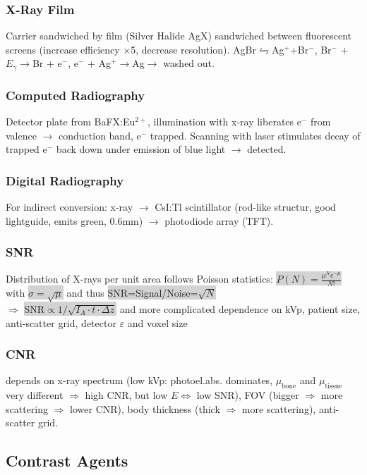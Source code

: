 \documentclass[9pt]{article}
\newcommand{\grey}[1]{\setlength{\fboxsep}{0pt}\colorbox{lightgrey}{#1}}
\begin{document}
\begin{multicols}{2}
\subsubsection{X-Ray Film}
Carrier sandwiched by film (Silver Halide AgX) sandwiched between fluorescent screens (increase efficiency $\times$5, decrease resolution). AgBr$\leftrightharpoons$Ag${}^+$+Br${}^-$, Br${}^-$ + $E_\gamma\rightarrow$Br + e${}^-$, e${}^-$ + Ag${}^+ \rightarrow$Ag$\rightarrow$ washed out.

\subsubsection{Computed Radiography}
Detector plate from BaFX:Eu${}^{2+}$, illumination with x-ray liberates e${}^-$ from valence $\rightarrow$ conduction band, e${}^-$ trapped. Scanning with laser stimulates decay of trapped e${}^-$ back down under emission of blue light $\rightarrow$ detected.

\subsubsection{Digital Radiography} For indirect conversion: x-ray $\rightarrow$ CsI:Tl scintillator (rod-like structur, good lightguide, emits green, 0.6mm) $\rightarrow$ photodiode array (TFT).

\subsubsection{SNR}
Distribution of X-rays per unit area follows Poisson statistics: \grey{$P(N)=\frac{\mu^Ne^{-\mu}}{N!}$} with \grey{$\sigma = \sqrt{\mu}$} and thus \grey{SNR=Signal/Noise=$\sqrt{N}$}\\
$\Rightarrow$ \grey{SNR$\propto 1 / \sqrt{I_A\cdot t \cdot \Delta z}$} and more complicated dependence on kVp, patient size, anti-scatter grid, detector $\varepsilon$ and voxel size

\subsubsection{CNR} depends on x-ray spectrum (low kVp: photoel.abs. dominates, $\mu_\mathrm{bone}$ and $\mu_\mathrm{tissue}$ very different $\Rightarrow$ high CNR, but low $E \Leftrightarrow$ low SNR), FOV (bigger $\Rightarrow$ more scattering $\Rightarrow$ lower CNR), body thickness (thick $\Rightarrow$ more scattering), anti-scatter grid.

\subsection{Contrast Agents}

\end{multicols}
\end{document}

